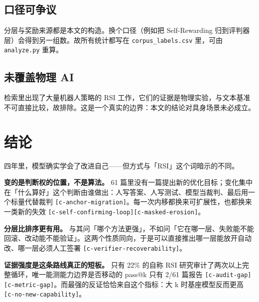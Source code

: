 \subsection{口径可争议}

分层与奖励来源都是本文的构造。换个口径（例如把 Self-Rewarding 归到评判器层）会得到另一组数。故所有统计都写在 \texttt{corpus\_labels.csv} 里，可由 \texttt{analyze.py} 重算。


\subsection{未覆盖物理 AI}

检索里出现了大量机器人策略的 RSI 工作，它们的证据是物理实验，与文本基准不可直接比较，故排除。这是一个真实的边界：本文的结论对具身场景未必成立。


\section{结论}

四年里，模型确实学会了改进自己——但方式与「RSI」这个词暗示的不同。


\textbf{变的是判断权的位置，不是算法。} 61 篇里没有一篇提出新的优化目标；变化集中在「什么算好」这个判断由谁做出：人写答案、人写测试、模型当裁判、最后用一个标量代替裁判 {\scriptsize\texttt{[c-\hspace{0pt}anchor-\hspace{0pt}migration]}}。每一次内移都换来可扩展性，也都换来一类新的失效 {\scriptsize\texttt{[c-\hspace{0pt}self-\hspace{0pt}confirming-\hspace{0pt}loop]}}{\scriptsize\texttt{[c-\hspace{0pt}masked-\hspace{0pt}erosion]}}。


\textbf{分层比排序更有用。} 与其问「哪个方法更强」，不如问「它在哪一层、失败能不能回滚、改动能不能验证」。这两个性质同向，于是可以直接推出哪一层能放开自动改、哪一层必须人工签署 {\scriptsize\texttt{[c-\hspace{0pt}verifier-\hspace{0pt}recoverability]}}。


\textbf{证据强度是这条路线真正的短板。} 只有 22\% 的自称 RSI 研究审计了两次以上完整循环，唯一能测能力边界是否移动的 pass@k 只有 2/61 篇报告 {\scriptsize\texttt{[c-\hspace{0pt}audit-\hspace{0pt}gap]}}{\scriptsize\texttt{[c-\hspace{0pt}metric-\hspace{0pt}gap]}}。而最强的反证恰恰来自这个指标：大 k 时基座模型反而更高 {\scriptsize\texttt{[c-\hspace{0pt}no-\hspace{0pt}new-\hspace{0pt}capability]}}。


